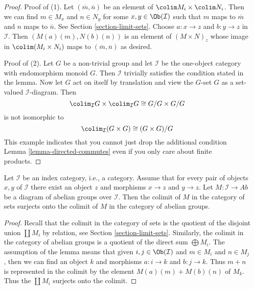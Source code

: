 \begin{proof}
Proof of (1). Let $(\overline{m}, \overline{n})$
be an element of $\colim M_i \times \colim N_i$.
Then we can find $m \in M_x$ and $n \in N_y$ for some
$x, y \in \Ob(\mathcal{I})$ such that $m$ maps to
$\overline{m}$ and $n$ maps to $\overline{n}$. See
Section \ref{section-limit-sets}.
Choose $a : x \to z$ and $b : y \to z$
in $\mathcal{I}$. Then $(M(a)(m), N(b)(n))$ is an element of
$(M \times N)_z$ whose image in $\colim (M_i \times N_i)$
maps to $(\overline{m}, \overline{n})$ as desired.

\medskip\noindent
Proof of (2). Let $G$ be a non-trivial group and
let $\mathcal{I}$ be the one-object category with endomorphism monoid $G$.
Then $\mathcal{I}$ trivially satisfies the condition stated in the lemma.
Now let $G$ act on itself by translation and view the $G$-set $G$
as a set-valued $\mathcal{I}$-diagram. Then
$$
\colim_\mathcal{I} G \times \colim_\mathcal{I} G \cong G/G \times G/G
$$
is not isomorphic to
$$
\colim_\mathcal{I} (G \times G) \cong (G \times G)/G
$$
This example indicates that you cannot just drop the additional
condition Lemma \ref{lemma-directed-commutes}
even if you only care about finite products.
\end{proof}

\begin{lemma}
\label{lemma-colimits-abelian-as-sets}
Let $\mathcal{I}$ be an index category, i.e., a category. Assume
that for every pair of objects $x, y$ of $\mathcal{I}$
there exist an object $z$ and morphisms $x \to z$ and $y \to z$.
Let $M : \mathcal{I} \to \textit{Ab}$ be a diagram of abelian
groups over $\mathcal{I}$. Then the colimit of $M$ in the category
of sets surjects onto the colimit of $M$ in the category of
abelian groups.
\end{lemma}

\begin{proof}
Recall that the colimit in the category of sets is the quotient of
the disjoint union $\coprod M_i$ by relation, see
Section \ref{section-limit-sets}.
Similarly, the colimit in the category of abelian groups is a quotient
of the direct sum $\bigoplus M_i$.
The assumption of the lemma means that given $i, j \in \Ob(\mathcal{I})$
and $m \in M_i$ and $n \in M_j$, then we can find an object
$k$ and morphisms $a : i \to k$ and $b : j \to k$.
Thus $m + n$ is represented in the colimit by the element
$M(a)(m) + M(b)(n)$ of $M_k$. Thus the $\coprod M_i$
surjects onto the colimit.
\end{proof}

